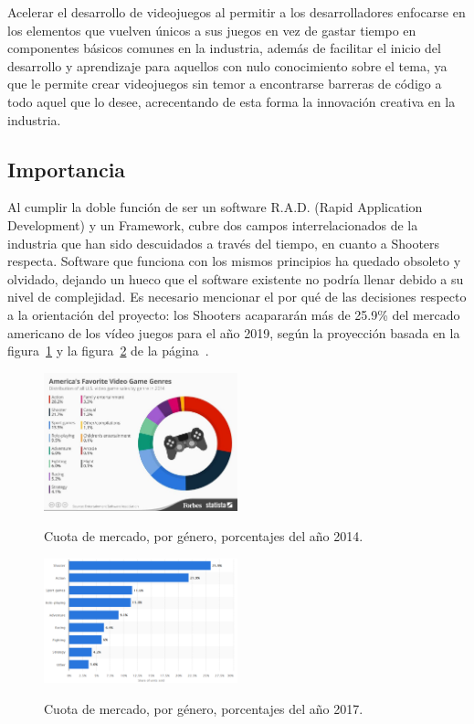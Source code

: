 \documentclass[]{article}
\begin{document}
Acelerar el desarrollo 
de videojuegos al permitir a los desarrolladores 
enfocarse en los elementos que vuelven \'unicos a sus
juegos en vez de gastar tiempo en componentes b\'asicos comunes en la industria, adem\'as de facilitar el inicio del desarrollo y aprendizaje para aquellos con nulo conocimiento sobre el tema, ya que le permite crear videojuegos sin temor a encontrarse barreras de c\'odigo a todo aquel que lo desee, acrecentando de esta forma la innovaci\'on creativa en la industria.

\subsection{Importancia}

Al cumplir la doble funci\'on de ser un software R.A.D. (Rapid Application Development) y un Framework, cubre dos campos interrelacionados de la industria que han sido descuidados a trav\'es del tiempo, en cuanto a Shooters respecta. 
Software que funciona con los mismos principios ha quedado obsoleto y olvidado, dejando un hueco que el software existente no podr\'ia llenar debido a su nivel de complejidad.
\newline
Es necesario mencionar el por qu\'e de las decisiones respecto a la orientaci\'on del proyecto: los Shooters acaparar\'an m\'as de 25.9\% del  mercado americano de los v\'ideo juegos para el a\~no 2019, seg\'un la proyecci\'on basada en la figura~\ref{fig:FORB}  y la figura~\ref{fig:STAT} de la p\'agina~\pageref{fig:STAT}.


\begin{figure}[H]
	
	\centering
	\includegraphics[width=0.5\textwidth]{Picture1}
	\caption{Cuota de mercado, por g\'enero, porcentajes del a\~no 2014.} 
	\label{fig:FORB}
	\cite{Forbes}
	
	
\end{figure}

\begin{figure}[H]
	
	\centering
	\includegraphics[width=0.5\textwidth]{statista-2}
	\caption{Cuota de mercado, por g\'enero, porcentajes del a\~no 2017.  } 
	\label{fig:STAT}
	\cite{Statista}
	
	
\end{figure}
\end{document}

